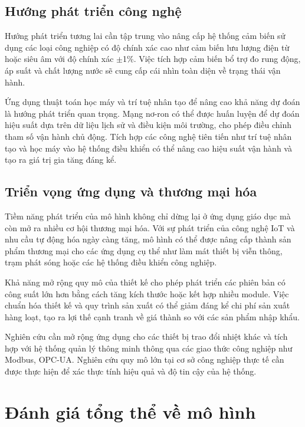 \documentclass[../main.tex]{subfiles}
\begin{document}
\subsection{Hướng phát triển công nghệ}
\label{sec:technology_development}

Hướng phát triển tương lai cần tập trung vào nâng cấp hệ thống cảm biến sử dụng các loại công nghiệp có độ chính xác cao như cảm biến lưu lượng điện từ hoặc siêu âm với độ chính xác $\pm$1\%. Việc tích hợp cảm biến bổ trợ đo rung động, áp suất và chất lượng nước sẽ cung cấp cái nhìn toàn diện về trạng thái vận hành.

Ứng dụng thuật toán học máy và trí tuệ nhân tạo để nâng cao khả năng dự đoán là hướng phát triển quan trọng. Mạng nơ-ron có thể được huấn luyện để dự đoán hiệu suất dựa trên dữ liệu lịch sử và điều kiện môi trường, cho phép điều chỉnh tham số vận hành chủ động. Tích hợp các công nghệ tiên tiến như trí tuệ nhân tạo và học máy vào hệ thống điều khiển có thể nâng cao hiệu suất vận hành và tạo ra giá trị gia tăng đáng kể.

\subsection{Triển vọng ứng dụng và thương mại hóa}
\label{sec:commercialization_prospects}

Tiềm năng phát triển của mô hình không chỉ dừng lại ở ứng dụng giáo dục mà còn mở ra nhiều cơ hội thương mại hóa. Với sự phát triển của công nghệ IoT và nhu cầu tự động hóa ngày càng tăng, mô hình có thể được nâng cấp thành sản phẩm thương mại cho các ứng dụng cụ thể như làm mát thiết bị viễn thông, trạm phát sóng hoặc các hệ thống điều khiển công nghiệp.

Khả năng mở rộng quy mô của thiết kế cho phép phát triển các phiên bản có công suất lớn hơn bằng cách tăng kích thước hoặc kết hợp nhiều module. Việc chuẩn hóa thiết kế và quy trình sản xuất có thể giảm đáng kể chi phí sản xuất hàng loạt, tạo ra lợi thế cạnh tranh về giá thành so với các sản phẩm nhập khẩu.

Nghiên cứu cần mở rộng ứng dụng cho các thiết bị trao đổi nhiệt khác và tích hợp với hệ thống quản lý thông minh thông qua các giao thức công nghiệp như Modbus, OPC-UA. Nghiên cứu quy mô lớn tại cơ sở công nghiệp thực tế cần được thực hiện để xác thực tính hiệu quả và độ tin cậy của hệ thống.

\section{Đánh giá tổng thể về mô hình}
\label{sec:model_overall_assessment}
\end{document}

